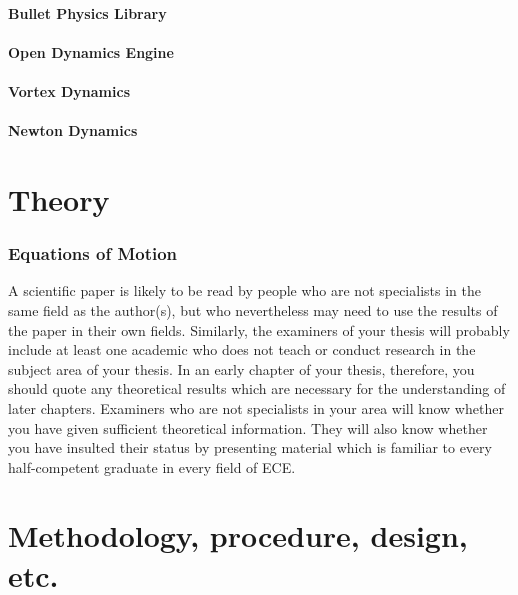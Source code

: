 \documentclass[12pt,openany,a4paper]{book}
\begin{document}
\subsubsection{Bullet Physics Library}

\subsubsection{Open Dynamics Engine}

\subsubsection{Vortex Dynamics}

\subsubsection{Newton Dynamics}



\chapter{Theory}





\subsection{Equations of Motion}



A scientific paper is likely to be read by people who are not
specialists in the same field as the author(s), but who nevertheless
may need to use the results of the paper in their own fields.
Similarly, the examiners of your thesis will probably include at least
one academic who does not teach or conduct research in the subject
area of your thesis.  In an early chapter of your thesis, therefore,
you should quote any theoretical results which are necessary for the
understanding of later chapters.  Examiners who are not specialists in
your area will know whether you have given sufficient theoretical
information.  They will also know whether you have insulted their
status by presenting material which is familiar to every
half-competent graduate in every field of ECE.

\chapter{Methodology, procedure, design, etc.}
\end{document}
